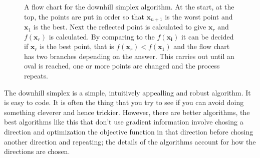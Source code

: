 \documentclass[11pt,a4paper]{scrartcl}
\begin{document}
\begin{figure}
\begin{center}
\end{center}
\caption{A flow chart for the downhill simplex algorithm. At the
  start, at the top, the points are put in order so that
  $\mathbf{x}_{n+1}$ is the worst point and $\mathbf{x}_1$ is the
  best. Next the reflected point is calculated to give $\mathbf{x}_r$
  and $f(\mathbf{x}_r)$ is calculated. By comparing to the
  $f(\mathbf{x_i})$ it can be decided if $\mathbf{x}_r$ is the best
  point, that is $f(\mathbf{x}_r)<f(\mathbf{x}_1)$ and the flow chart
  has two branches depending on the answer. This carries out until an
  oval is reached, one or more points are changed and the process
  repeats.\label{fig:flowchart}}
\end{figure}

The downhill simplex is a simple, intuitively appealling and robust
algorithm. It is easy to code. It is often the thing that you try to
see if you can avoid doing something cleverer and hence
trickier. However, there are better algorithms, the best algorithms
like this that don't use gradient information involve chosing a
direction and optimization the objective function in that direction
before chosing another direction and repeating; the details of the
algorithms account for how the directions are chosen.
\end{document}
